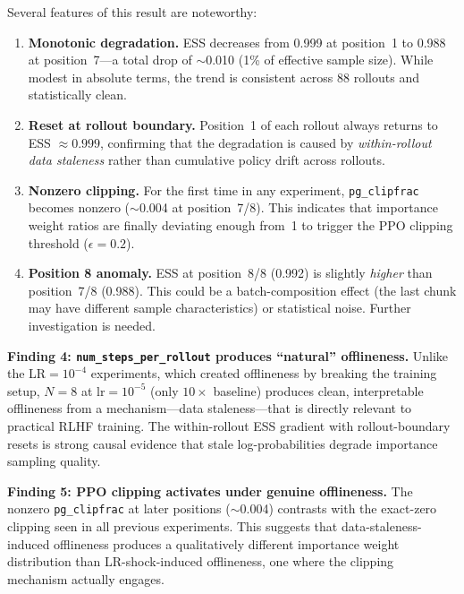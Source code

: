 \documentclass[11pt,a4paper]{article}
\begin{document}
Several features of this result are noteworthy:

\begin{enumerate}[leftmargin=*]
  \item \textbf{Monotonic degradation.} ESS decreases from 0.999 at position~1
    to 0.988 at position~7---a total drop of $\sim$0.010 (1\% of effective
    sample size). While modest in absolute terms, the trend is consistent across
    88 rollouts and statistically clean.

  \item \textbf{Reset at rollout boundary.} Position~1 of each rollout always
    returns to ESS $\approx 0.999$, confirming that the degradation is caused by
    \emph{within-rollout data staleness} rather than cumulative policy drift
    across rollouts.

  \item \textbf{Nonzero clipping.} For the first time in any experiment,
    \texttt{pg\_clipfrac} becomes nonzero ($\sim$0.004 at position~7/8). This
    indicates that importance weight ratios are finally deviating enough from~1
    to trigger the PPO clipping threshold ($\epsilon = 0.2$).

  \item \textbf{Position 8 anomaly.} ESS at position~8/8 (0.992) is slightly
    \emph{higher} than position~7/8 (0.988). This could be a batch-composition
    effect (the last chunk may have different sample characteristics) or
    statistical noise. Further investigation is needed.
\end{enumerate}

\begin{keyinsight}
\textbf{Finding 4: \texttt{num\_steps\_per\_rollout} produces ``natural''
offlineness.} Unlike the LR${}= 10^{-4}$ experiments, which created offlineness
by breaking the training setup, $N = 8$ at $\mathrm{lr} = 10^{-5}$ (only
$10\times$ baseline) produces clean, interpretable offlineness from a
mechanism---data staleness---that is directly relevant to practical RLHF
training. The within-rollout ESS gradient with rollout-boundary resets is
strong causal evidence that stale log-probabilities degrade importance sampling
quality.
\end{keyinsight}

\begin{keyinsight}
\textbf{Finding 5: PPO clipping activates under genuine offlineness.} The
nonzero \texttt{pg\_clipfrac} at later positions ($\sim$0.004) contrasts with
the exact-zero clipping seen in all previous experiments. This suggests that
data-staleness-induced offlineness produces a qualitatively different
importance weight distribution than LR-shock-induced offlineness, one where the
clipping mechanism actually engages.
\end{keyinsight}
\end{document}

